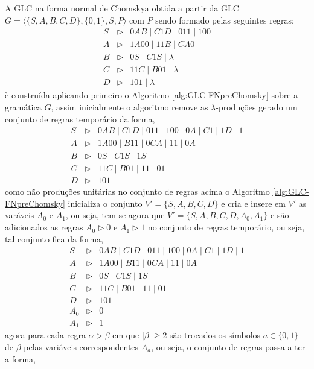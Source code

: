 \begin{example}
    A GLC na forma normal de Chomskya obtida a partir da GLC $G = \langle \{S, A, B, C, D\}, \{0,1\}, S, P \rangle$ com $P$ sendo formado pelas seguintes regras:
    \begin{eqnarray*}
        S & \rhd & 0AB \mid C1D \mid 011 \mid 100\\
        A & \rhd & 1A00 \mid 11B \mid CA0\\
        B & \rhd & 0S \mid C1S \mid \lambda\\
        C & \rhd & 11C \mid B01 \mid \lambda\\
        D & \rhd & 101 \mid \lambda
    \end{eqnarray*}
    è construída aplicando primeiro o Algoritmo \ref{alg:GLC-FNpreChomsky} sobre a gramática $G$, assim inicialmente o algoritmo remove as $\lambda$-produções gerado um conjunto de regras temporário da forma,
    \begin{eqnarray*}
        S & \rhd & 0AB \mid C1D \mid 011 \mid 100 \mid 0A \mid C1 \mid 1D \mid 1\\
        A & \rhd & 1A00 \mid B11 \mid 0CA \mid 11 \mid 0A\\
        B & \rhd & 0S \mid C1S \mid 1S\\
        C & \rhd & 11C \mid B01 \mid 11 \mid 01\\
        D & \rhd & 101
    \end{eqnarray*}
    como não produções unitárias no conjunto de regras acima o Algoritmo \ref{alg:GLC-FNpreChomsky} inicializa o conjunto $V' = \{S, A, B, C, D\}$ e cria e insere em $V'$ as varáveis $A_0$ e $A_1$, ou seja, tem-se agora que $V' = \{S, A, B, C, D, A_0, A_1\}$ e são adicionados as regras  $A_0 \rhd 0$ e $A_1 \rhd 1$ no conjunto de regras temporário, ou seja, tal conjunto fica da forma,
    \begin{eqnarray*}
        S & \rhd & 0AB \mid C1D \mid 011 \mid 100 \mid 0A \mid C1 \mid 1D \mid 1\\
        A & \rhd & 1A00 \mid B11 \mid 0CA \mid 11 \mid 0A\\
        B & \rhd & 0S \mid C1S \mid 1S\\
        C & \rhd & 11C \mid B01 \mid 11 \mid 01\\
        D & \rhd & 101\\
        A_0 & \rhd & 0 \\
        A_1 & \rhd & 1
    \end{eqnarray*}
    agora para cada regra $\alpha \rhd \beta$ em que $|\beta| \geq 2$ são trocados os símbolos $a \in \{0,1\}$ de $\beta$ pelas variáveis correspondentes $A_a$, ou seja, o conjunto de regras passa a ter a forma, 

\end{example}

